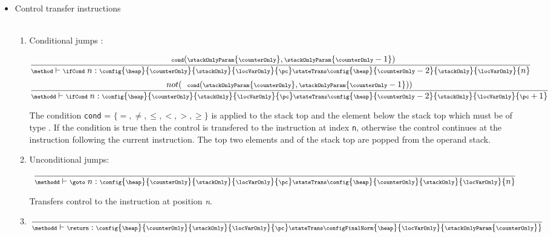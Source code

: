\begin{itemize}
       \item Control transfer instructions \\\\

        \begin{enumerate}
            \item Conditional jumps : \ifCond


        $$ 
           {\scriptsize \frac{ \mbox{ \rm \texttt{ cond}}( \stackOnlyParam{\counterOnly}, \stackOnlyParam{\counterOnly - 1}) } 			       		               
                      {\method \vdash \ifCond \ n : \config{\heap }{\counterOnly}{\stackOnly}{\locVarOnly}{\pc}
		                      \stateTrans 
				      \config{\heap}{\counterOnly - 2}{\stackOnly}{\locVarOnly}{n}} 
            }    $$
		$$ {\scriptsize
                 \frac{  not (\mbox{ \rm \texttt{ cond}}( \stackOnlyParam{\counterOnly}, \stackOnlyParam{\counterOnly - 1})) }		                             
                     {\methodd \vdash \ifCond \ n : \config{\heap}{\counterOnly}{\stackOnly}{\locVarOnly}{\pc} 
		                    \stateTrans 
                                    \config{\heap}{\counterOnly - 2}{\stackOnly}{\locVarOnly}{\pc + 1}} }
           $$
            

	    The condition \texttt{cond} = $\{ =, \neq, \le, <, >, \ge \} $ is applied to the stack top  \stackOnlyParam{\counterOnly} and the element below the stack top
	     which must be of type \Myint. If the condition is true then the control is transfered to the instruction
	    at index \texttt{n}, otherwise the control continues at the instruction following the current instruction. The top two elements \stackOnlyParam{\counterOnly} and
              of the stack top are popped from the operand stack.
 
        \item Unconditional jumps: \goto \\
            $${\scriptsize \frac{  }
	            {\methodd \vdash \goto \ n: \config{\heap}{\counterOnly}{\stackOnly}{\locVarOnly}{\pc} 
		                    \stateTrans 
                                    \config{\heap}{\counterOnly}{\stackOnly}{\locVarOnly}{ n}} }$$
				    
   
             Transfers control to the instruction at position \textit{n}.


      \item \return
        $$ {\scriptsize \frac{ } 
            {\methodd \vdash \return :\config{\heap}{\counterOnly}{\stackOnly}{\locVarOnly}{\pc} 
		                    \stateTrans 
                                    \configFinalNorm{\heap}{\locVarOnly}{\stackOnlyParam{\counterOnly}}}   }  $$


\end{enumerate}
\end{itemize}
